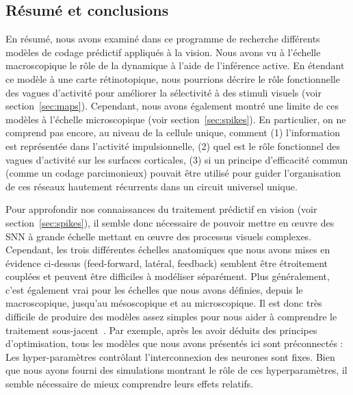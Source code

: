 \subsection{Résumé et conclusions}
En résumé, nous avons examiné dans ce programme de recherche différents modèles de
codage prédictif appliqués à la vision. Nous avons vu à l'échelle
macroscopique le rôle de la dynamique à l'aide de l'inférence active. %
En étendant ce modèle à une carte rétinotopique, nous
pourrions décrire le rôle fonctionnelle des vagues d'activité pour améliorer la sélectivité à des
stimuli visuels (voir section~\ref{sec:maps}). Cependant, nous avons également montré
une limite de ces modèles à l'échelle microscopique (voir section~\ref{sec:spikes}). En
particulier, on ne comprend pas encore, au niveau de la cellule unique,
comment (1) l'information est représentée dans l'activité impulsionnelle, (2)
quel est le rôle fonctionnel des vagues d'activité sur les surfaces
corticales, (3) si un principe d'efficacité commun (comme un codage
parcimonieux) pouvait être utilisé pour guider l'organisation de ces réseaux
hautement récurrents dans un circuit universel unique.

Pour approfondir nos connaissances du traitement prédictif en vision
(voir section~\ref{sec:spikes}), il semble donc nécessaire de pouvoir mettre en œuvre
des SNN à grande échelle mettant en œuvre des processus visuels
complexes. Cependant, les trois différentes échelles anatomiques que
nous avons mises en évidence ci-dessus (feed-forward, latéral, feedback)
semblent être étroitement couplées et peuvent être difficiles à
modéliser séparément. Plus généralement, c'est également vrai pour les
échelles que nous avons définies, depuis le macroscopique, jusqu'au mésoscopique
et au microscopique. Il est donc très difficile de produire des modèles
assez simples pour nous aider à comprendre le traitement sous-jacent~\citep{Varoquaux19,Brette19}. Par exemple, après les avoir
déduits des principes d'optimisation, tous les modèles que nous avons
présentés ici sont préconnectés : Les hyper-paramètres contrôlant
l'interconnexion des neurones sont fixes. Bien que nous ayons fourni des
simulations montrant le rôle de ces hyperparamètres, il semble
nécessaire de mieux comprendre leurs effets relatifs. %

